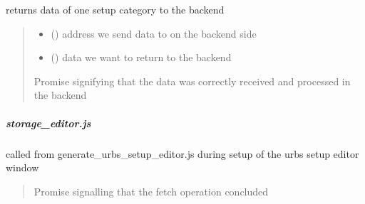\documentclass[letterpaper,10pt,english]{sphinxmanual}
\begin{document}

\begin{fulllineitems}
\label{\detokenize{docs_gui/js_api/urbs_editor/return_urbs_setup:postData}}
\pysigstartsignatures
{}
\pysigstopsignatures
\sphinxAtStartPar
returns data of one setup category to the backend
\begin{quote}\begin{description}
\begin{itemize}
\item {} 
\sphinxAtStartPar
{} () \textendash{} address we send data to on the backend side

\item {} 
\sphinxAtStartPar
{} () \textendash{} data we want to return to the backend

\end{itemize}

\sphinxAtStartPar
Promise signifying that the data was correctly received and processed in the backend

\end{description}\end{quote}

\end{fulllineitems}


\sphinxstepscope


\subparagraph{storage\_editor.js}
\label{\detokenize{docs_gui/js_api/urbs_editor/storage_editor:storage-editor-js}}\label{\detokenize{docs_gui/js_api/urbs_editor/storage_editor::doc}}

\begin{fulllineitems}
\label{\detokenize{docs_gui/js_api/urbs_editor/storage_editor:fetchStorageProfiles}}
\pysigstartsignatures
{}
\pysigstopsignatures
\sphinxAtStartPar
called from generate\_urbs\_setup\_editor.js during setup of the urbs setup editor window
\begin{quote}\begin{description}
\sphinxAtStartPar
Promise signalling that the fetch operation concluded

\end{description}\end{quote}

\end{fulllineitems}
\end{document}
